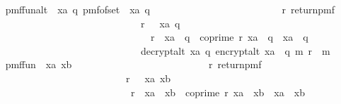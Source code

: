 \begin{isabellebody}
\isanewline
\ \ \isamarkupfalse%
\ {\isacharquery}{\kern0pt}pmf{\isacharunderscore}{\kern0pt}fun{\isacharunderscore}{\kern0pt}{}alt\ {\isacharequal}{\kern0pt}\ {\isachardoublequoteopen}{\isasymlambda}xa{\isachardot}{\kern0pt}\ {\isasymlambda}q{\isachardot}{\kern0pt}\ {\isacharparenleft}{\kern0pt}pmf{\isacharunderscore}{\kern0pt}of{\isacharunderscore}{\kern0pt}set\ {\isacharparenleft}{\kern0pt}{\isacharquery}{\kern0pt}{\isasymZ}\ xa\ q{\isacharparenright}{\kern0pt}\ {\isasymbind}\isanewline
\ \ \ \ \ \ \ \ \ \ \ \ \ \ \ \ \ \ \ \ \ \ \ \ \ {\isacharparenleft}{\kern0pt}{\isasymlambda}r{\isachardot}{\kern0pt}\ return{\isacharunderscore}{\kern0pt}pmf\isanewline
\ \ \ \ \ \ \ \ \ \ \ \ \ \ \ \ \ \ \ \ \ \ \ \ \ \ \ \ \ \ \ {\isacharparenleft}{\kern0pt}{\isacharparenleft}{\kern0pt}r\ {\isasymin}\ {\isacharparenleft}{\kern0pt}{\isacharquery}{\kern0pt}{\isasymZ}\ xa\ q{\isacharparenright}{\kern0pt}\ {\isasymor}\isanewline
\ \ \ \ \ \ \ \ \ \ \ \ \ \ \ \ \ \ \ \ \ \ \ \ \ \ \ \ \ \ \ \ \ r\ {\isacharless}{\kern0pt}\ xa\ {\isacharasterisk}{\kern0pt}\ q\ {\isasymand}\ coprime\ r\ {\isacharparenleft}{\kern0pt}xa\ {\isacharasterisk}{\kern0pt}\ q{\isacharparenright}{\kern0pt}\ {\isasymand}\ xa\ {\isasymnoteq}\ q{\isacharparenright}{\kern0pt}\ {\isasymor}\isanewline
\ \ \ \ \ \ \ \ \ \ \ \ \ \ \ \ \ \ \ \ \ \ \ \ \ \ \ \ \ \ \ decrypt{\isacharunderscore}{\kern0pt}alt\ xa\ q\ {\isacharparenleft}{\kern0pt}encrypt{\isacharunderscore}{\kern0pt}alt\ {\isacharparenleft}{\kern0pt}xa\ {\isacharasterisk}{\kern0pt}\ q{\isacharparenright}{\kern0pt}\ m\ r{\isacharparenright}{\kern0pt}\ {\isacharequal}{\kern0pt}\ m{\isacharparenright}{\kern0pt}{\isacharparenright}{\kern0pt}{\isacharparenright}{\kern0pt}{\isachardoublequoteclose}\isanewline
\ \ \isanewline
\ \ \isamarkupfalse%
\ {\isacharquery}{\kern0pt}pmf{\isacharunderscore}{\kern0pt}fun{\isacharunderscore}{\kern0pt}{}\ {\isacharequal}{\kern0pt}\ {\isachardoublequoteopen}{\isasymlambda}xa\ xb{\isachardot}{\kern0pt}\ \isanewline
\ \ \ \ \ \ \ \ \ \ \ \ \ \ \ \ \ \ \ \ \ \ \ \ \ \ {\isacharparenleft}{\kern0pt}{\isasymlambda}r{\isachardot}{\kern0pt}\ {\isacharparenleft}{\kern0pt}return{\isacharunderscore}{\kern0pt}pmf\isanewline
\ \ \ \ \ \ \ \ \ \ \ \ \ \ \ \ \ \ \ \ \ \ \ \ \ \ \ \ {\isacharparenleft}{\kern0pt}{\isacharparenleft}{\kern0pt}r\ {\isasymin}\ {\isacharparenleft}{\kern0pt}{\isacharquery}{\kern0pt}{\isasymZ}\ xa\ xb{\isacharparenright}{\kern0pt}\ {\isasymor}\isanewline
\ \ \ \ \ \ \ \ \ \ \ \ \ \ \ \ \ \ \ \ \ \ \ \ \ \ \ \ \ r\ {\isacharless}{\kern0pt}\ xa\ {\isacharasterisk}{\kern0pt}\ xb\ {\isasymand}\ coprime\ r\ {\isacharparenleft}{\kern0pt}xa\ {\isacharasterisk}{\kern0pt}\ xb{\isacharparenright}{\kern0pt}\ {\isasymand}\ xa\ {\isasymnoteq}\ xb{\isacharparenright}{\kern0pt}\ {\isasymor}\isanewline

\end{isabellebody}
